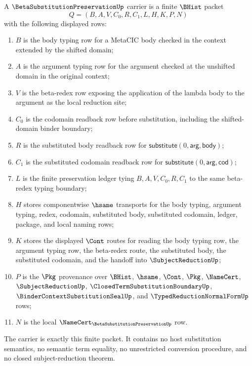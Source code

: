 \begin{definition}
\label{def:betasubstitutionpreservation-carrier}
A $\BetaSubstitutionPreservationUp$ carrier is a finite $\BHist$ packet
$$
Q=(B,A,V,C_0,R,C_1,L,H,K,P,N)
$$
with the following displayed rows:
\begin{enumerate}
\item $B$ is the body typing row for a MetaCIC body checked in the context extended by the shifted domain;
\item $A$ is the argument typing row for the argument checked at the unshifted domain in the original context;
\item $V$ is the beta-redex row exposing the application of the lambda body to the argument as the local reduction site;
\item $C_0$ is the codomain readback row before substitution, including the shifted-domain binder boundary;
\item $R$ is the substituted body readback row for $\mathsf{substitute}(0,\mathsf{arg},\mathsf{body})$;
\item $C_1$ is the substituted codomain readback row for $\mathsf{substitute}(0,\mathsf{arg},\mathsf{cod})$;
\item $L$ is the finite preservation ledger tying $B,A,V,C_0,R,C_1$ to the same beta-redex typing boundary;
\item $H$ stores componentwise $\hsame$ transports for the body typing, argument typing, redex, codomain, substituted body, substituted codomain, ledger, package, and local naming rows;
\item $K$ stores the displayed $\Cont$ routes for reading the body typing row, the argument typing row, the beta-redex route, the substituted body, the substituted codomain, and the handoff into $\SubjectReductionUp$;
\item $P$ is the $\Pkg$ provenance over $\BHist$, $\hsame$, $\Cont$, $\Pkg$, $\NameCert$, $\SubjectReductionUp$, $\ClosedTermSubstitutionBoundaryUp$, $\BinderContextSubstitutionSealUp$, and $\TypedReductionNormalFormUp$ rows;
\item $N$ is the local $\NameCert_{\BetaSubstitutionPreservationUp}$ row.
\end{enumerate}
The carrier is exactly this finite packet. It contains no host substitution semantics, no semantic term equality, no unrestricted conversion procedure, and no closed subject-reduction theorem.
\end{definition}

